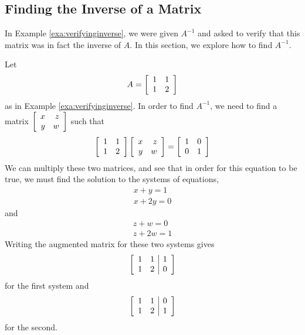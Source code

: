 
\subsection{Finding the Inverse of a Matrix}

In Example \ref{exa:verifyinginverse}, we were given $A^{-1}$ and asked to verify that this matrix
was in fact the inverse of $A$. In this section, we explore how to find $A^{-1}$. 

Let 
\begin{equation*}
A=\left[
\begin{array}{rr}
1 & 1 \\
1 & 2
\end{array}
\right]
\end{equation*}
as in Example \ref{exa:verifyinginverse}. 
In order to find $A^{-1}$, we need to find
a matrix $\left[
\begin{array}{rr}
x & z \\
y & w
\end{array}
\right] $ such that
\begin{equation*}
\left[
\begin{array}{rr}
1 & 1 \\
1 & 2
\end{array}
\right] \left[
\begin{array}{rr}
x & z \\
y & w
\end{array}
\right] =\left[
\begin{array}{rr}
1 & 0 \\
0 & 1
\end{array}
\right] 
\end{equation*}
We can multiply these two matrices, and see that in order for this equation to be true, we must find the solution to the systems of equations,
\begin{equation*}
\begin{array}{c}
x+y=1 \\
x+2y=0
\end{array}
\end{equation*}
and
\begin{equation*}
\begin{array}{c}
z+w=0 \\
z+2w=1
\end{array}
\end{equation*}
Writing the augmented matrix for these two systems gives
\begin{equation*}
\left[
\begin{array}{rr|r}
1 & 1 & 1 \\
1 & 2 & 0
\end{array}
\right]  
\end{equation*}
for the first system and
\begin{equation}
\left[
\begin{array}{rr|r}
1 & 1 & 0 \\
1 & 2 & 1
\end{array}
\right]  \label{inverse2a}
\end{equation}
for the second. 

